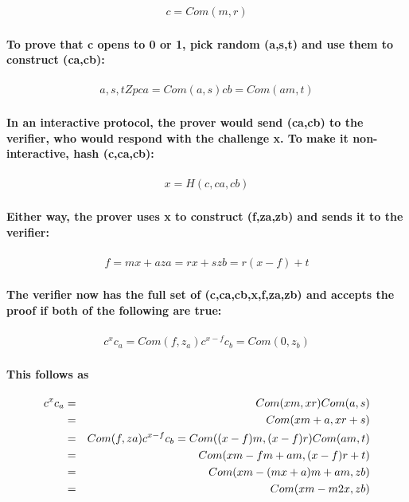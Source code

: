 \documentclass{article}
\begin{document}
\begin{eqnarray}
  c=Com(m, r)
\end{eqnarray}

\paragraph{To prove that c opens to 0 or 1, pick random (a,s,t) and use them to construct (ca,cb):}

\begin{eqnarray}
  a,s,tZp
  ca=Com(a, s)
  cb=Com(am,t)
\end{eqnarray}

\paragraph{In an interactive protocol, the prover would send (ca,cb) to the verifier, who would respond with the challenge x.  To make it non-interactive, hash (c,ca,cb):}

\begin{eqnarray}
  x=H(c,ca,cb)
\end{eqnarray}

\paragraph{Either way, the prover uses x to construct (f,za,zb) and sends it to the verifier:}
 
\begin{eqnarray}
  f =mx+a
  za=rx+s
  zb=r (x-f)+t
\end{eqnarray}

\paragraph{The verifier now has the full set of (c,ca,cb,x,f,za,zb) and accepts the proof if both of the following are true:}

\begin{eqnarray}
  c^x c_a = Com(f,z_a)
  c^{x-f} c_b = Com(0,z_b)
\end{eqnarray}

\paragraph{This follows as }

\begin{eqnarray}
  c^x c_a &=& Com(xm,xr) Com(a,s)
  \cr &=& Com(xm+a,xr+s)
  \cr &=& Com(f,za)
  c^{x-f} c_b = Com((x-f)m,(x-f)r) Com(am,t)
  \cr &=& Com(xm-fm+am,(x-f)r+t)
  \cr &=& Com(xm-(mx+a)m+am,zb)
  \cr &=& Com(xm-m2x,zb)
\end{eqnarray}
\end{document}
